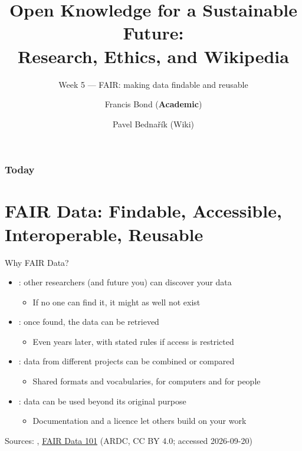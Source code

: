 \documentclass[aspectratio=169]{beamer}
\title[FAIR]{Open Knowledge for a Sustainable Future:\\ Research, Ethics, and Wikipedia}
\subtitle{Week 5 --- FAIR: making data findable and reusable}
\author[Bond \& Bednařík]{Francis Bond (\textbf{Academic}) \and Pavel Bednařík (Wiki)}
\institute[UPOL \& Wikimedia]{Palacký University Olomouc \quad | \quad Wikimedia ČR}
\date{}
\begin{document}
\begin{frame}
  \titlepage
\end{frame}

\begin{frame}
  \frametitle{Today}
  \small
  \tableofcontents[hideallsubsections]
\end{frame}


\section{FAIR Data: Findable, Accessible, Interoperable, Reusable}

\begin{frame}{Why FAIR Data?}
\begin{itemize}
  \item {}: other researchers (and future you) can discover your data
    \begin{itemize}
    \item If no one can find it, it might as well not exist
    \end{itemize}
  \item {}: once found, the data can be retrieved
    \begin{itemize}
    \item Even years later, with stated rules if access is restricted
    \end{itemize}
  \item {}: data from different projects can be combined or compared
    \begin{itemize}
    \item Shared formats and vocabularies, for computers and for people
    \end{itemize}
  \item {}: data can be used beyond its original purpose
    \begin{itemize}
    \item Documentation and a licence let others build on your work
    \end{itemize}
\end{itemize}

\medskip
\tiny Sources: \citep{FAIR2016},
\href{https://au-research.github.io/FAIR-data-101-training/}{FAIR Data 101} (ARDC, CC BY 4.0; accessed 2026-09-20)
\end{frame}
\end{document}
